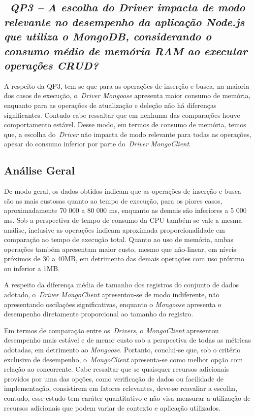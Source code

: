 \documentclass{svproc}
\begin{document}
\subsection{~\emph{QP3 -- A escolha do Driver impacta de modo relevante no desempenho da aplicação Node.js que utiliza o MongoDB, considerando o consumo médio de memória RAM ao executar operações CRUD?}}
\label{q3}

A respeito da QP3, tem-se que para as operações de inserção e busca, na maioria dos casos de execução, o~\emph{Driver} \emph{Mongoose} apresenta maior consumo de memória, enquanto para as operações de atualização e deleção não há diferenças significantes.
Contudo cabe ressaltar que em nenhuma das comparações houve comportamento estável.
Desse modo, em termos de consumo de memória, temos que, a escolha do~\emph{Driver} não impacta de modo relevante para todas as operações, apesar do consumo inferior por parte do~\emph{Driver} \emph{MongoClient}.

\subsection{Análise Geral}
\label{qgeral}

De modo geral, os dados obtidos indicam que as operações de inserção e busca são as mais custosas quanto ao tempo de execução, para os piores casos, aproximadamente 70 000 a 80 000 ms, enquanto as demais são inferiores a 5 000 ms.
Sob a perspectiva de tempo de consumo da CPU também se vale a mesma análise, inclusive as operações indicam aproximada proporcionalidade em comparação ao tempo de execução total.
Quanto ao uso de memória, ambas operações também apresentam maior custo, mesmo que não-linear, em níveis próximos de 30 a 40MB, em detrimento das demais operações com uso próximo ou inferior a 1MB.

A respeito da diferença média de tamanho dos registros do conjunto de dados adotado, o~\emph{Driver} \emph{MongoClient} apresentou-se de modo indiferente, não apresentando oscilações significativas, enquanto o \emph{Mongoose} apresenta o desempenho diretamente proporcional ao tamanho do registro.

Em termos de comparação entre os~\emph{Drivers}, o \emph{MongoClient} apresentou desempenho mais estável e de menor custo sob a perspectiva de todas as métricas adotadas, em detrimento ao \emph{Mongoose}. Portanto, conclui-se que, sob o critério exclusivo de desempenho, o~\emph{MongoClient} apresenta-se como melhor opção com relação ao concorrente. Cabe ressaltar que se quaisquer recursos adicionais providos por uma das opções, como verificação de dados ou facilidade de implementação, consistirem em fatores relevantes, deve-se reavaliar a escolha, contudo, esse estudo tem caráter quantitativo e não visa mensurar a utilização de recursos adicionais que podem variar de contexto e aplicação utilizados.
\end{document}
